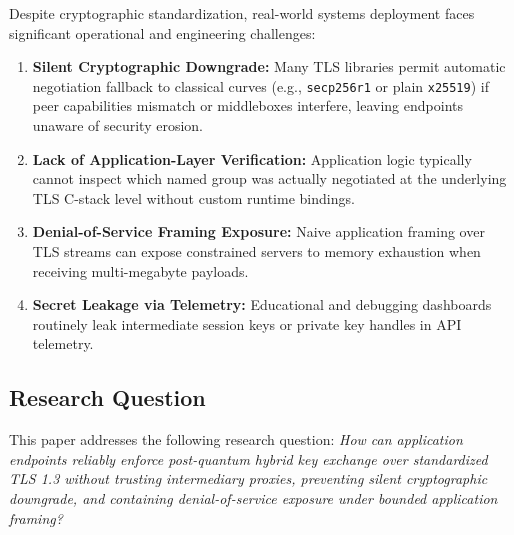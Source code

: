 \documentclass[conference]{IEEEtran}
\begin{document}
Despite cryptographic standardization, real-world systems deployment faces significant operational and engineering challenges:
\begin{enumerate}
    \item \textbf{Silent Cryptographic Downgrade:} Many TLS libraries permit automatic negotiation fallback to classical curves (e.g., \texttt{secp256r1} or plain \texttt{x25519}) if peer capabilities mismatch or middleboxes interfere, leaving endpoints unaware of security erosion.
    \item \textbf{Lack of Application-Layer Verification:} Application logic typically cannot inspect which named group was actually negotiated at the underlying TLS C-stack level without custom runtime bindings.
    \item \textbf{Denial-of-Service Framing Exposure:} Naive application framing over TLS streams can expose constrained servers to memory exhaustion when receiving multi-megabyte payloads.
    \item \textbf{Secret Leakage via Telemetry:} Educational and debugging dashboards routinely leak intermediate session keys or private key handles in API telemetry.
\end{enumerate}

\subsection{Research Question}
This paper addresses the following research question:
\textit{How can application endpoints reliably enforce post-quantum hybrid key exchange over standardized TLS 1.3 without trusting intermediary proxies, preventing silent cryptographic downgrade, and containing denial-of-service exposure under bounded application framing?}
\end{document}
